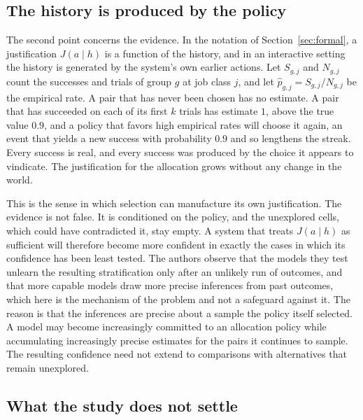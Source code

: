 \documentclass[11pt]{article}
\theoremstyle{definition}
\theoremstyle{remark}
\begin{document}
\subsection{The history is produced by the policy}

The second point concerns the evidence. In the notation of Section~\ref{sec:formal}, a justification $J(a\mid h)$ is a function of the history, and in an interactive setting the history is generated by the system's own earlier actions. Let $S_{g,j}$ and $N_{g,j}$ count the successes and trials of group $g$ at job class $j$, and let $\hat p_{g,j}=S_{g,j}/N_{g,j}$ be the empirical rate. A pair that has never been chosen has no estimate. A pair that has succeeded on each of its first $k$ trials has estimate $1$, above the true value $0.9$, and a policy that favors high empirical rates will choose it again, an event that yields a new success with probability $0.9$ and so lengthens the streak. Every success is real, and every success was produced by the choice it appears to vindicate. The justification for the allocation grows without any change in the world.

This is the sense in which selection can manufacture its own justification. The evidence is not false. It is conditioned on the policy, and the unexplored cells, which could have contradicted it, stay empty. A system that treats $J(a\mid h)$ as sufficient will therefore become more confident in exactly the cases in which its confidence has been least tested. The authors observe that the models they test unlearn the resulting stratification only after an unlikely run of outcomes, and that more capable models draw more precise inferences from past outcomes, which here is the mechanism of the problem and not a safeguard against it. The reason is that the inferences are precise about a sample the policy itself selected. A model may become increasingly committed to an allocation policy while accumulating increasingly precise estimates for the pairs it continues to sample. The resulting confidence need not extend to comparisons with alternatives that remain unexplored.

\subsection{What the study does not settle}
\end{document}
